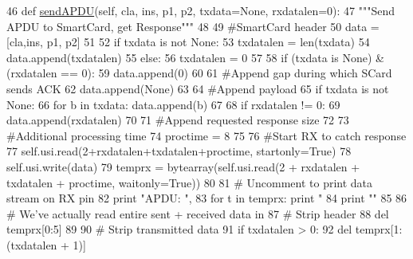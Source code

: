 \begin{DoxyCode}
46     \textcolor{keyword}{def }\hyperlink{classsoftware_1_1chipwhisperer_1_1capture_1_1targets_1_1smartcard__readers_1_1chipwhisperer__usi_1_1ReaderChipWhispererUSI_a2df2aa799a6ca8496348ea9f07bf3f00}{sendAPDU}(self, cla, ins, p1, p2, txdata=None, rxdatalen=0):
47         \textcolor{stringliteral}{"""Send APDU to SmartCard, get Response"""}
48 
49         \textcolor{comment}{#SmartCard header}
50         data = [cla,ins, p1, p2]
51 
52         \textcolor{keywordflow}{if} txdata \textcolor{keywordflow}{is} \textcolor{keywordflow}{not} \textcolor{keywordtype}{None}:
53             txdatalen = len(txdata)
54             data.append(txdatalen)
55         \textcolor{keywordflow}{else}:
56             txdatalen = 0
57 
58         \textcolor{keywordflow}{if} (txdata \textcolor{keywordflow}{is} \textcolor{keywordtype}{None}) & (rxdatalen == 0):
59             data.append(0)
60 
61         \textcolor{comment}{#Append gap during which SCard sends ACK}
62         data.append(\textcolor{keywordtype}{None})
63 
64         \textcolor{comment}{#Append payload}
65         \textcolor{keywordflow}{if} txdata \textcolor{keywordflow}{is} \textcolor{keywordflow}{not} \textcolor{keywordtype}{None}:
66             \textcolor{keywordflow}{for} b \textcolor{keywordflow}{in} txdata: data.append(b)
67 
68         \textcolor{keywordflow}{if} rxdatalen != 0:
69             data.append(rxdatalen)
70 
71         \textcolor{comment}{#Append requested response size}
72 
73         \textcolor{comment}{#Additional processing time}
74         proctime = 8
75 
76         \textcolor{comment}{#Start RX to catch response}
77         self.usi.read(2+rxdatalen+txdatalen+proctime, startonly=\textcolor{keyword}{True})
78         self.usi.write(data)
79         temprx = bytearray(self.usi.read(2 + rxdatalen + txdatalen + proctime, waitonly=\textcolor{keyword}{True}))
80 
81         \textcolor{comment}{# Uncomment to print data stream on RX pin}
82         \textcolor{keywordflow}{print} \textcolor{stringliteral}{"APDU: "},
83         \textcolor{keywordflow}{for} t \textcolor{keywordflow}{in} temprx: \textcolor{keywordflow}{print} \textcolor{stringliteral}{"%
84         \textcolor{keywordflow}{print} \textcolor{stringliteral}{""}
85 
86         \textcolor{comment}{# We've actually read entire sent + received data in}
87         \textcolor{comment}{# Strip header}
88         del temprx[0:5]
89 
90         \textcolor{comment}{# Strip transmitted data}
91         \textcolor{keywordflow}{if} txdatalen > 0:
92             del temprx[1:(txdatalen + 1)]
}
\end{DoxyCode}
